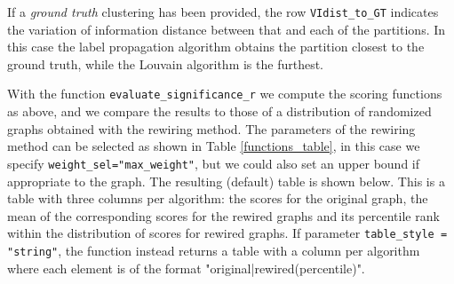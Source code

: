 If a \textit{ground truth} clustering has been provided, the row \texttt{VIdist\_to\_GT} indicates the variation of information distance \citep{varinformation} between that and each of the partitions. In this case the label propagation algorithm obtains the partition closest to the ground truth, while the Louvain algorithm is the furthest.

With the function \texttt{evaluate\_significance\_r} we compute the scoring functions as above, and we compare the results to those of a distribution of randomized graphs obtained with the rewiring method. %
The parameters of the rewiring method can be selected as 
shown in Table \ref{functions_table}, 
in this case we specify \texttt{weight\_sel="max\_weight"}, but we could also set an upper bound if appropriate to the graph. 
The resulting (default) table is shown below. 
This is a table with three columns per algorithm: the scores for the original graph, the
mean of the corresponding scores for the rewired graphs  and its percentile rank
within the distribution of scores for rewired graphs. 
If parameter {\tt table\_style = "string"}, the function instead returns a table with a column per algorithm where each element
is of the format "original|rewired(percentile)".


